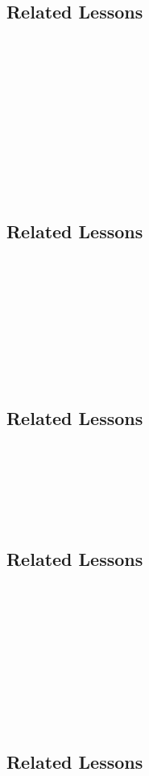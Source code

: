 \subsection{Related Lessons}
\fourdOne{}\\
\fourdTwo{}\\
\fourdTwentyOne{}\\
\foureEleven{}\\
\fouriSeven{}\\
\fourjFour{}\\
\fourjFive{}\\
\fourjSix{}\\
\fourjSeven{}\\
\fourjEleven{}\\
%
\subsection{Related Lessons}
\fourcOne{}\\
\fourcTwo{}\\
\fourcThree{}\\
\fourdSixteen{}\\
\fourdSeventeen{}\\
\fourdNineteen{}\\
\foureSeven{}\\
\fourFKThirtyOne{}\\
%
\subsection{Related Lessons}
\fourdTwo{}\\
\fourdEighteen{}\\
\fourdNineteen{}\\
\foureOne{}\\
\foureEight{}\\
%
\subsection{Related Lessons}
\fourcTwo{}\\
\fourdFifteen{}\\
\fourdSixteen{}\\
\fourdSeventeen{}\\
\fourdNineteen{}\\
\fourjTen{}\\
\fourkTwo{}\\
\fourFKThirtyEight{}\\
\fourFKFourty{}\\
%
\subsection{Related Lessons}
\fourcOne{}\\
\fourcTwo{}\\
\fourdOne{}\\\
\fourdTwo{}\\\
\fourdFifteen{}\\
\fourdSixteen{}\\
\fourdSeventeen{}\\
\fourdNineteen{}\\
\foureSeven{}\\
\fourFKEighteen{}\\
\fourFKTwenty{}\\
\fourFKTwentyOne{}\\
